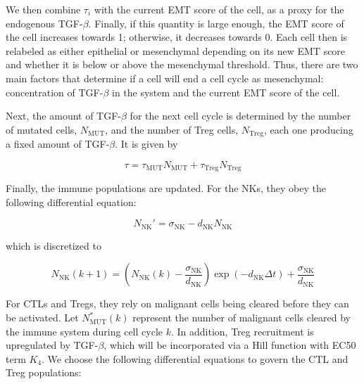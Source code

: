 \documentclass[11pt]{article}
\begin{document}
We then combine $\tau_i$ with the current EMT score of the cell, as a proxy for the endogenous TGF-$\beta$.
Finally, if this quantity is large enough, the EMT score of the cell increases towards 1; otherwise, it decreases towards 0.
Each cell then is relabeled as either epithelial or mesenchymal depending on its new EMT score and whether it is below or above the mesenchymal threshold.
Thus, there are two main factors that determine if a cell will end a cell cycle as mesenchymal: concentration of TGF-$\beta$ in the system and the current EMT score of the cell.

Next, the amount of TGF-$\beta$ for the next cell cycle is determined by the number of mutated cells, $N_{\text{MUT}}$, and the number of Treg cells, $N_{\text{Treg}}$, each one producing a fixed amount of TGF-$\beta$. It is given by

\begin{equation}\tag{2.6}
\tau = \tau_{\text{MUT}}N_{\text{MUT}} + \tau_{\text{Treg}}N_{\text{Treg}}
\end{equation}


Finally, the immune populations are updated.
For the NKs, they obey the following differential equation:
 
\begin{equation}\tag{2.7}
N_{\text{NK}}' = \sigma_{\text{NK}} - d_{\text{NK}}N_{\text{NK}}
\end{equation}

which is discretized to
 
 \begin{equation}\tag{2.8}
N_{\text{NK}}(k+1) = \left (N_{\text{NK}}(k)-\frac{\sigma_{\text{NK}}}{d_{\text{NK}}} \right )\exp(-d_{\text{NK}}\Delta t)+\frac{\sigma_{\text{NK}}}{d_{\text{NK}}}
\end{equation}

For CTLs and Tregs, they rely on malignant cells being cleared before they can be activated.
Let $N_{\text{MUT}}^*(k)$ represent the number of malignant cells cleared by the immune system during cell cycle $k$.
In addition, Treg recruitment is upregulated by TGF-$\beta$, which will be incorporated via a Hill function with EC50 term $K_4$.
We choose the following differential equations to govern the CTL and Treg populations:
\end{document}
